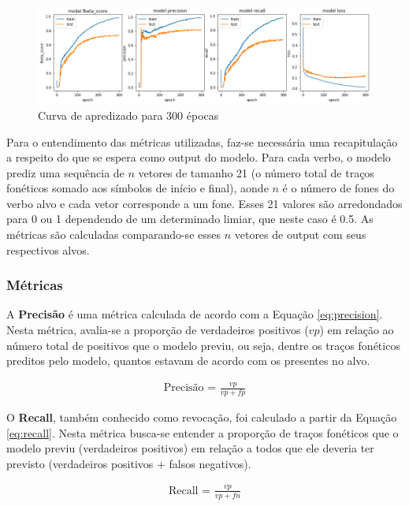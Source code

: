\begin{figure}[H]
  \centering
  \includegraphics[width=1.0\linewidth]{img/300_fbeta.png}
  \caption{Curva de apredizado para 300 épocas}
  \label{fig:training}
\end{figure}

Para o entendimento das métricas utilizadas, faz-se necessária uma recapitulação a respeito do que se espera como output do modelo. Para cada verbo, o modelo prediz uma sequência de $n$ vetores de tamanho 21 (o número total de traços fonéticos somado aos símbolos de início e final), aonde $n$ é o número de fones do verbo alvo e cada vetor corresponde a um fone. Esses 21 valores são arredondados para 0 ou 1 dependendo de um determinado limiar, que neste caso é 0.5. As métricas são calculadas comparando-se esses $n$ vetores de output com seus respectivos alvos.

\subsubsection{Métricas}

A \textbf{Precisão} é uma métrica calculada de acordo com a Equação \ref{eq:precision}. Nesta métrica, avalia-se a proporção de verdadeiros positivos ($vp$) em relação ao número total de positivos que o modelo previu, ou seja, dentre os traços fonéticos preditos pelo modelo, quantos estavam de acordo com os presentes no alvo.


\begin{align}\label{eq:precision}
\text{Precisão = } \frac{vp}{vp + fp}
\end{align}

O \textbf{Recall}, também conhecido como revocação, foi calculado a partir da Equação \ref{eq:recall}. Nesta métrica busca-se entender a proporção de traços fonéticos que o modelo previu (verdadeiros positivos) em relação a todos que ele deveria ter previsto (verdadeiros positivos + falsos negativos). 

\begin{align}\label{eq:recall}
\text{Recall = } \frac{vp}{vp + fn}
\end{align}

